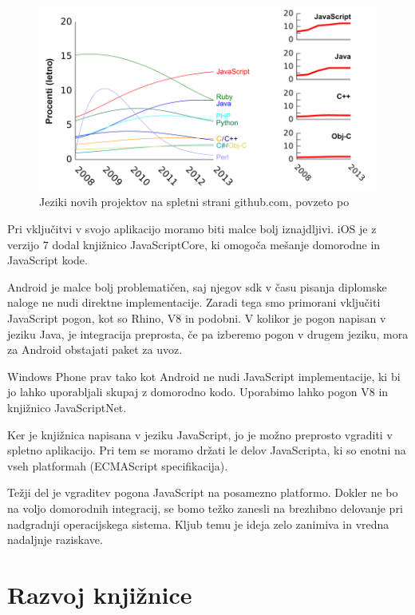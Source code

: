 \begin{figure}
 \includegraphics[width=\linewidth]{github-jeziki}
 \caption{Jeziki novih projektov na spletni strani github.com, povzeto po\cite{redmonk}}
 \label{fig:github-jeziki}
\end{figure}

Pri vključitvi v svojo aplikacijo moramo biti malce bolj iznajdljivi. iOS je z verzijo 7 dodal knjižnico JavaScriptCore, ki omogoča mešanje domorodne in JavaScript kode.

Android je malce bolj problematičen, saj njegov \gls{sdk} v času pisanja diplomske naloge ne nudi direktne implementacije. Zaradi tega smo primorani vključiti JavaScript pogon, kot so Rhino, V8 in podobni. V kolikor je pogon napisan v jeziku Java, je integracija preprosta, če pa izberemo pogon v drugem jeziku, mora za Android obstajati paket za uvoz.

Windows Phone prav tako kot Android ne nudi JavaScript implementacije, ki bi jo lahko uporabljali skupaj z domorodno kodo. Uporabimo lahko pogon V8 in knjižnico JavaScriptNet\cite{javascriptdotnet}.

Ker je knjižnica napisana v jeziku JavaScript, jo je možno preprosto vgraditi v spletno aplikacijo. Pri tem se moramo držati le delov JavaScripta, ki so enotni na vseh platformah (ECMAScript specifikacija\cite{ecmascript}).

Težji del je vgraditev pogona JavaScript na posamezno platformo. Dokler ne bo na voljo domorodnih integracij, se bomo težko zanesli na brezhibno delovanje pri nadgradnji operacijskega sistema. Kljub temu je ideja zelo zanimiva in vredna nadaljnje raziskave.

\chapter{Razvoj knjižnice}
\label{chap:development}

